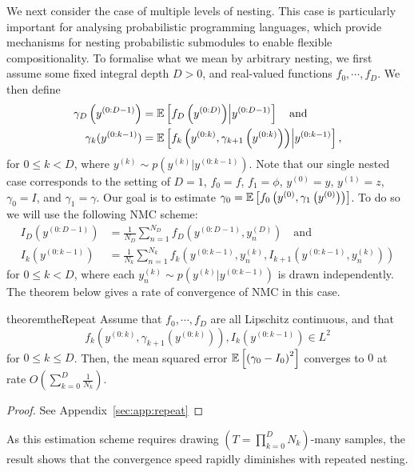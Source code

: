 We next consider the case of multiple levels of nesting.
This case is particularly important for analysing probabilistic programming
languages, which provide mechanisms for nesting probabilistic
submodules to enable flexible compositionality.
To formalise what we mean by arbitrary nesting, we first assume some fixed integral depth
$D > 0$, and real-valued functions $f_0, \cdots, f_D$.
We then define
\begin{align*}
  \gamma_D\left(y^{(0:D-1)}\right) &= \mathbb{E} \left[f_D\left(y^{(0:D)}\right) \middle| y^{(0:D-1)}\right] \quad \text{and} \\
  \gamma_k(y^{(0:k-1)}) &= \mathbb{E} \left[f_k\left(y^{(0:k)}, \gamma_{k+1}\left(y^{(0:k)}\right)\right) \middle| y^{(0:k-1)}\right],
\end{align*}
for $0 \leq k < D$, where $y^{(k)} \sim p\left(y^{(k)}|y^{(0:k-1)}\right)$. 
Note that our single nested case corresponds to the setting of $D=1$, $f_0 = f$, $f_1 = \phi$, $y^{(0)}=y$,
$y^{(1)}=z$, $\gamma_0 = I$, and $\gamma_1 = \gamma$. Our goal is to
estimate $\gamma_0 = \mathbb{E} \left[f_0\left(y^{(0)},
\gamma_1\left(y^{(0)}\right)\right)\right]$. To do so we will use the following NMC scheme:
\begin{align*}
  I_D\left(y^{(0:D-1)}\right) &= \frac{1}{N_D} \sum_{n=1}^{N_D} f_D\left(y^{(0:D-1)}, y^{(D)}_n\right) \quad \text{and} \\
  I_k\left(y^{(0:k-1)}\right) &= \frac{1}{N_k} \sum_{n=1}^{N_k} f_k\left(y^{(0:k-1)}, y^{(k)}_n, I_{k+1}\left(y^{(0:k-1)}, y^{(k)}_n\right)\right)
\end{align*}
for $0 \leq k < D$, where each $y^{(k)}_n \sim p\left(y^{(k)}|y^{(0:k-1)}\right)$ is drawn
independently. The theorem below gives a rate of convergence of NMC in this case.
\begin{restatable}{theorem}{theRepeat} \label{the:Repeat}
  Assume that $f_0, \cdots, f_D$ are all Lipschitz continuous, and 
  that 
  \[
          f_k\left(y^{(0:k)}, \gamma_{k+1}\left(y^{(0:k)}\right)\right), I_k\left(y^{(0:k-1)}\right) \in L^2 
  \]
  for $0 \leq k \leq D$. Then, the mean squared error $\mathbb{E} \left[\left(\gamma_0 - I_0\right)^2\right]$ 
  converges to $0$ at rate $O\left(\sum_{k=0}^D
  \frac{1}{N_k}\right)$.
\end{restatable}
\begin{proof}
	See Appendix~\ref{sec:app:repeat}
\end{proof}
As this estimation scheme requires drawing $\left(T = \prod_{k=0}^{D} N_k\right)$-many samples, the
result shows that the convergence speed rapidly diminishes with repeated nesting.
